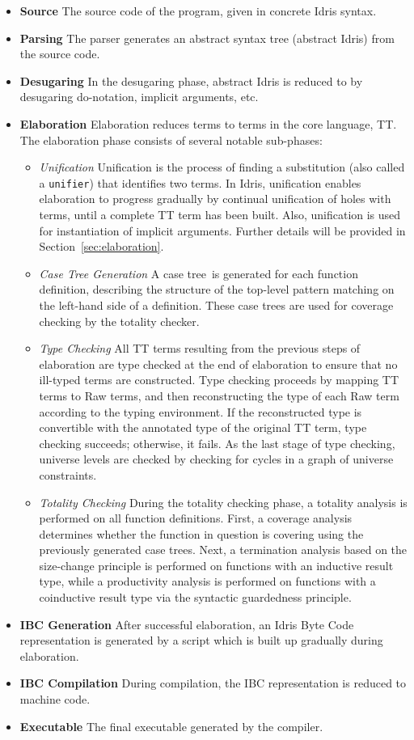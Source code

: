 \begin{itemize}
\item \textbf{Source}
The source code of the program, given in concrete Idris syntax.
\item \textbf{Parsing}
The parser generates an abstract syntax tree (abstract Idris) from the source code.
\item \textbf{Desugaring}
 In the desugaring phase, abstract Idris is reduced to \IdrisM{} by
 desugaring do-notation, implicit arguments, etc.
\item \textbf{Elaboration}
Elaboration reduces \IdrisM{} terms to terms in the core language, TT. The
elaboration phase consists of several notable sub-phases:
\begin{itemize}
\item \textit{Unification} Unification is the process of finding a substitution
  (also called a \texttt{unifier}) that identifies two terms. In Idris,
  unification enables elaboration to progress gradually by continual unification
  of holes with terms, until a complete TT term has been built. Also,
  unification is used for instantiation of implicit arguments. Further details
  will be provided in Section~\ref{sec:elaboration}.
\item \textit{Case Tree Generation}
A case tree\,\citep{Augustsson:1985} is generated for each function definition,
describing the structure of the top-level pattern matching on the left-hand side
of a definition. These case trees are
used for coverage checking by the totality checker.
\item \textit{Type Checking} All TT terms resulting from the previous steps of
  elaboration are type checked at the end of elaboration to ensure that no
  ill-typed terms are constructed. Type checking proceeds by mapping TT terms to
  Raw terms, and then reconstructing the type of each Raw term according to the
  typing environment. If the reconstructed type is convertible with the
  annotated type of the original TT term, type checking succeeds; otherwise, it
  fails. As the last stage of type checking, universe levels are checked by
  checking for cycles in a graph of universe constraints.
\item \textit{Totality Checking} During the totality checking phase, a totality
  analysis is performed on all function definitions. First, a coverage analysis
  determines whether the function in question is covering using the previously
  generated case trees. Next, a termination analysis based on the size-change
  principle is performed on functions with an inductive result type, while a
  productivity analysis is performed on functions with a coinductive result type via the
  syntactic guardedness principle.
\end{itemize}
\item \textbf{IBC Generation}
After successful elaboration, an Idris Byte Code representation is
generated by a script which is built up gradually during elaboration. 
\item \textbf{IBC Compilation}
During compilation, the IBC representation is reduced to machine code.
\item \textbf{Executable}
The final executable generated by the compiler.
\end{itemize}
